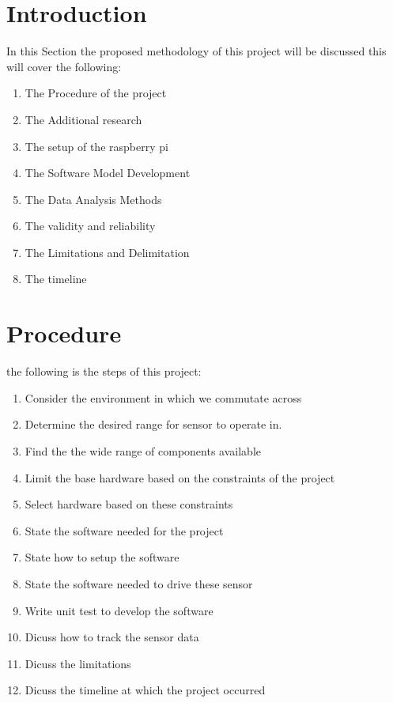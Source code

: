 
\section{Introduction}
In this  Section the  proposed  methodology of this  project will be discussed this will cover the  following:
\begin{enumerate}
    \item The Procedure of the project
    \item The Additional research
    \item The setup of the raspberry pi
    \item The Software Model Development
    \item The Data Analysis Methods
    \item The validity and reliability 
    \item The Limitations and Delimitation
    \item The timeline
\end{enumerate} 
\section{Procedure}
the following is the steps of this project:
\begin{enumerate}
    \item Consider the environment in which we commutate across
    \item Determine the desired  range  for sensor to operate in.
    \item Find the the wide range of components available
    \item Limit the base hardware based on the constraints of the project
    \item Select hardware based on these constraints
    \item State the software needed for the project
    \item State how to setup the software
    \item State the software needed to drive these sensor
    \item Write unit test to develop the software
    \item Dicuss how to track the sensor data
    \item Dicuss the limitations 
    \item Dicuss the timeline at which the project occurred
\end{enumerate}
